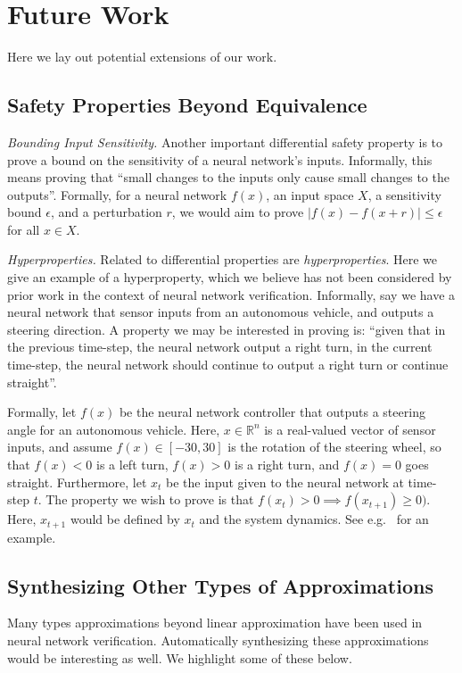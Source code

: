 \section{Future Work}
Here we lay out potential extensions of our work.

\subsection{Safety Properties Beyond Equivalence}
\textit{Bounding Input Sensitivity.} Another important differential safety
property is to prove a bound on the sensitivity of a neural network's
inputs. Informally, this means proving that ``small changes to the inputs
only cause small changes to the outputs''. Formally, for a neural network $
f(x) $, an input space $ X $, a sensitivity bound $ \epsilon $, and a
perturbation $ r $, we would aim to prove $ |f(x) - f(x + r)| \leq \epsilon
$ for all $ x \in X $.

\textit{Hyperproperties.} Related to differential properties are
\textit{hyperproperties}. Here we give an example of a hyperproperty, which
we believe has not been considered by prior work in the context of neural
network verification. Informally, say we have a neural network that sensor
inputs from an autonomous vehicle, and outputs a steering direction. A
property we may be interested in proving is: ``given that in the previous
time-step, the neural network output a right turn, in the current
time-step, the neural network should continue to output a right turn or
continue straight''.


Formally, let $ f(x) $ be the neural network controller that outputs a
steering angle for an autonomous vehicle. Here, $ x \in \mathbb{R}^n $ is a
real-valued vector of sensor inputs, and assume $ f(x) \in [-30, 30] $ is
the rotation of the steering wheel, so that $ f(x) < 0 $ is a left turn, $
f(x) > 0 $ is a right turn, and $ f(x) = 0 $ goes straight. Furthermore,
let $ x_t $ be the input given to the neural network at time-step $ t $.
The property we wish to prove is that $ f(x_t) > 0 \implies f(x_{t+1}) \geq
0) $. Here, $ x_{t+1} $ would be defined by $ x_t $ and the system
dynamics. See e.g.~\cite{hu2020reach} for an example.

\subsection{Synthesizing Other Types of Approximations}
Many types approximations beyond linear approximation have been used in
neural network verification. Automatically synthesizing these
approximations would be interesting as well. We highlight some of these
below.

